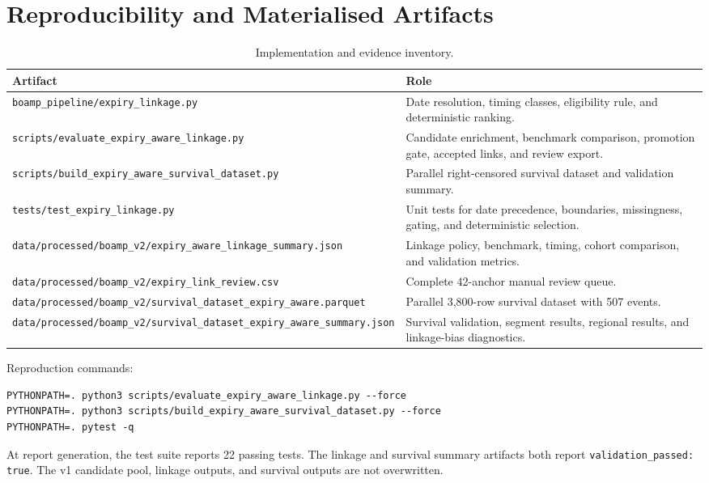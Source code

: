 \documentclass[11pt,a4paper]{article}
\newcommand{\code}[1]{\texttt{\small #1}}
\newcommand{\pathcode}[1]{{\small\nolinkurl{#1}}}
\begin{document}
\appendix

\section{Reproducibility and Materialised Artifacts}

\begin{table}[H]
\centering
\caption{Implementation and evidence inventory.}
\small
\begin{tabularx}{\textwidth}{p{4.9cm}X}
\toprule
\textbf{Artifact} & \textbf{Role} \\
\midrule
\pathcode{boamp_pipeline/expiry_linkage.py} & Date resolution, timing classes,
eligibility rule, and deterministic ranking. \\
\pathcode{scripts/evaluate_expiry_aware_linkage.py} & Candidate enrichment,
benchmark comparison, promotion gate, accepted links, and review export. \\
\pathcode{scripts/build_expiry_aware_survival_dataset.py} & Parallel right-censored
survival dataset and validation summary. \\
\pathcode{tests/test_expiry_linkage.py} & Unit tests for date precedence,
boundaries, missingness, gating, and deterministic selection. \\
\pathcode{data/processed/boamp_v2/expiry_aware_linkage_summary.json} & Linkage policy,
benchmark, timing, cohort comparison, and validation metrics. \\
\pathcode{data/processed/boamp_v2/expiry_link_review.csv} & Complete 42-anchor manual
review queue. \\
\pathcode{data/processed/boamp_v2/survival_dataset_expiry_aware.parquet} & Parallel
3,800-row survival dataset with 507 events. \\
\pathcode{data/processed/boamp_v2/survival_dataset_expiry_aware_summary.json} & Survival
validation, segment results, regional results, and linkage-bias diagnostics. \\
\bottomrule
\end{tabularx}
\end{table}

Reproduction commands:

\begin{verbatim}
PYTHONPATH=. python3 scripts/evaluate_expiry_aware_linkage.py --force
PYTHONPATH=. python3 scripts/build_expiry_aware_survival_dataset.py --force
PYTHONPATH=. pytest -q
\end{verbatim}

At report generation, the test suite reports 22 passing tests. The linkage and
survival summary artifacts both report \code{validation\_passed: true}. The v1
candidate pool, linkage outputs, and survival outputs are not overwritten.
\end{document}
